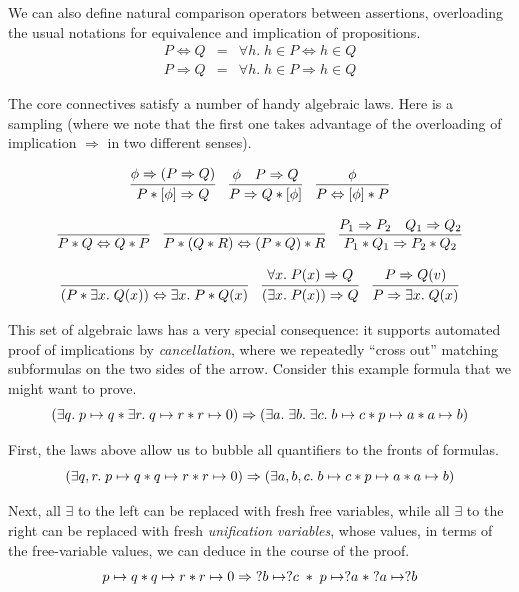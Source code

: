 \documentclass{amsbook}
\theoremstyle{definition}
\theoremstyle{remark}
\numberwithin{section}{chapter}
\numberwithin{equation}{chapter}
\begin{document}
We can also define natural comparison operators between assertions, overloading the usual notations for equivalence and implication of propositions.
\begin{eqnarray*}
  P \Leftrightarrow Q &=& \forall h. \; h \in P \Leftrightarrow h \in Q \\
  P \Rightarrow Q &=& \forall h. \; h \in P \Rightarrow h \in Q
\end{eqnarray*}

The core connectives satisfy a number of handy algebraic laws.
Here is a sampling (where we note that the first one takes advantage of the overloading of implication $\Rightarrow$ in two different senses).

$$\infer{P * \lift{\phi} \Rightarrow Q}{
  \phi \Rightarrow (P \Rightarrow Q)
}
\quad \infer{P \Rightarrow Q * \lift{\phi}}{
  \phi
  & P \Rightarrow Q
}
\quad \infer{P \Leftrightarrow \lift{\phi} * P}{
  \phi
}$$

$$\infer{P * Q \Leftrightarrow Q * P}{}
\quad \infer{P * (Q * R) \Leftrightarrow (P * Q) * R}{}
\quad \infer{P_1 * Q_1 \Rightarrow P_2 * Q_2}{
  P_1 \Rightarrow P_2
  & Q_1 \Rightarrow Q_2
}$$

$$\infer{(P * \exists x. \; Q(x)) \Leftrightarrow \exists x. \; P * Q(x)}{}
\quad \infer{(\exists x. \; P(x)) \Rightarrow Q}{
  \forall x. \; P(x) \Rightarrow Q
}
\quad \infer{P \Rightarrow \exists x. \; Q(x)}{
  P \Rightarrow Q(v)
}$$

This set of algebraic laws has a very special consequence: it supports automated proof of implications by \emph{cancellation}, where we repeatedly ``cross out'' matching subformulas on the two sides of the arrow.
Consider this example formula that we might want to prove.
$$(\exists q. \; p \mapsto q * \exists r. \; q \mapsto r * r \mapsto 0) \Rightarrow (\exists a. \; \exists b. \; \exists c. \; b \mapsto c * p \mapsto a * a \mapsto b)$$

First, the laws above allow us to bubble all quantifiers to the fronts of formulas.
$$(\exists q, r. \; p \mapsto q * q \mapsto r * r \mapsto 0) \Rightarrow (\exists a, b, c. \; b \mapsto c * p \mapsto a * a \mapsto b)$$

Next, all $\exists$ to the left can be replaced with fresh free variables, while all $\exists$ to the right can be replaced with fresh \emph{unification variables}, whose values, in terms of the free-variable values, we can deduce in the course of the proof.
$$p \mapsto q * q \mapsto r * r \mapsto 0 \Rightarrow \; ?b \mapsto ?c \; * \; p \mapsto ?a \; * \; ?a \mapsto ?b$$
\end{document}
